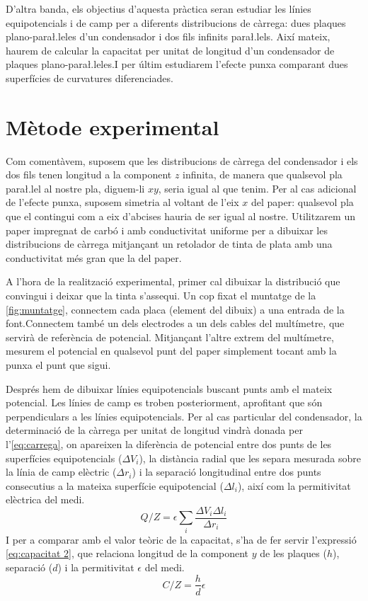 D'altra banda, els objectius d'aquesta pràctica seran estudiar les línies equipotencials i de camp per a diferents distribucions de càrrega: dues plaques plano-para\l.leles d'un condensador i dos fils infinits para\l.lels. Així mateix, haurem de calcular la capacitat per unitat de longitud d'un condensador de plaques plano-para\l.leles.I per últim estudiarem l'efecte punxa comparant dues superfícies de curvatures diferenciades.
\section{Mètode experimental}
Com comentàvem, suposem que les distribucions de càrrega del condensador i els dos fils tenen longitud a la component $z$ infinita, de manera que qualsevol pla para\l.lel al nostre pla, diguem-li $xy$, seria igual al que tenim. Per al cas adicional de l'efecte punxa, suposem simetria al voltant de l'eix $x$ del paper: qualsevol pla que el contingui com a eix d'abcises hauria de ser igual al nostre. Utilitzarem un paper impregnat de carbó i amb conductivitat uniforme per a dibuixar les distribucions de càrrega mitjançant un retolador de tinta de plata amb una conductivitat més gran que la del paper. 

A l'hora de la realització experimental, primer cal dibuixar la distribució que convingui i deixar que la tinta s'assequi. Un cop fixat el muntatge de la \cref{fig:muntatge}, connectem cada placa (element del dibuix) a una entrada de la font.Connectem també un dels electrodes a un dels cables del multímetre, que servirà de referència de potencial. Mitjançant l'altre extrem del multímetre, mesurem el potencial en qualsevol punt del paper simplement tocant amb la punxa el punt que sigui. 

Després hem de dibuixar línies equipotencials buscant punts amb el mateix potencial. Les línies de camp es troben posteriorment, aprofitant que són perpendiculars a les línies equipotencials. Per al cas particular del condensador, la determinació de la càrrega per unitat de longitud vindrà donada per l'\cref{eq:carrega}, on apareixen la diferència de potencial entre dos punts de les superfícies equipotencials ($\Delta V_i$), la distància radial que les separa mesurada sobre la línia de camp elèctric
		($\Delta r_i$) i la separació longitudinal entre dos punts consecutius a la mateixa superfície equipotencial ($\Delta l_i$), així com la permitivitat elèctrica del medi.
		\begin{equation}\label{eq:carrega}
			Q/Z=\epsilon \sum_i \frac{\Delta V_i \Delta l_i}{\Delta r_i}
		\end{equation}
I per a comparar amb el valor teòric de la capacitat, s'ha de fer servir l'expressió \cref{eq:capacitat 2}, que relaciona longitud de la component $y$ de les plaques ($h$), separació ($d$) i la permitivitat  $\epsilon$ del medi.
		\begin{equation}\label{eq:capacitat 2} 
			C/Z=\frac{h}{d}\epsilon
		\end{equation}

